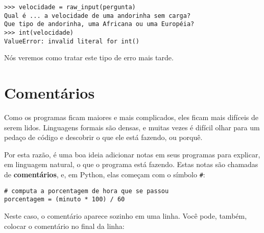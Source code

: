 \beforeverb
\begin{verbatim}
>>> velocidade = raw_input(pergunta)
Qual é ... a velocidade de uma andorinha sem carga?
Que tipo de andorinha, uma Africana ou uma Européia?
>>> int(velocidade)
ValueError: invalid literal for int()
\end{verbatim}
\afterverb
%

Nós veremos como tratar este tipo de erro mais tarde.


\section{Comentários}


Como os programas ficam maiores e mais complicados, eles ficam mais difíceis 
de serem lidos. Linguagens formais são densas, e muitas vezes é difícil 
olhar para um pedaço de código e descobrir o que ele está fazendo, ou porquê.

Por esta razão, é uma boa ideia adicionar notas em seus programas para explicar,
em linguagem natural, o que o programa está fazendo. Estas notas são chamadas 
de {\bf comentários}, e, em Python, elas começam com o símbolo \verb"#":

\beforeverb
\begin{verbatim}
# computa a porcentagem de hora que se passou
porcentagem = (minuto * 100) / 60
\end{verbatim}
\afterverb
%

Neste caso, o comentário aparece sozinho em uma linha. Você pode, também, colocar
o comentário no final da linha:

